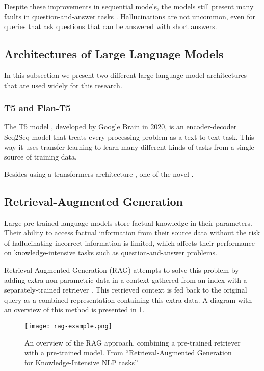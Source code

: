 Despite these improvements in sequential models, the models still present many faults in question-and-answer tasks \citep{how_can_we_know}.
Hallucinations are not uncommon, even for queries that ask questions that can be answered with short answers.

\subsection{Architectures of Large Language Models}
\label{llm_architectures}

In this subsection we present two different large language model architectures that are used widely for this research.

\subsubsection{T5 and Flan-T5}

The T5 model \citep{t5}, developed by Google Brain in 2020, is an encoder-decoder Seq2Seq model that treats every processing problem as a text-to-text task.
This way it uses transfer learning to learn many different kinds of tasks from a single source of training data.

Besides using a transformers architecture \citep{attention_is_all_you_need}, one of the novel .

\subsection{Retrieval-Augmented Generation}

Large pre-trained language models store factual knowledge in their parameters.
Their ability to access factual information from their source data without the risk of hallucinating incorrect information is limited, which affects their performance on knowledge-intensive tasks such as question-and-answer problems.

Retrieval-Augmented Generation (RAG) attempts to solve this problem by adding extra non-parametric data in a context gathered from an index with a separately-trained retriever \citep{rag}.
This retrieved context is fed back to the original query as a combined representation containing this extra data.
A diagram with an overview of this method is presented in \cref{rag_overview}.

\begin{figure}[htp]
	\centering
	\texttt{[image: rag-example.png]}
	\caption{An overview of the RAG approach, combining a pre-trained retriever with a pre-trained model. From ``Retrieval-Augmented Generation for Knowledge-Intensive NLP tasks'' \citep{rag}}
	\label{rag_overview}
\end{figure}

